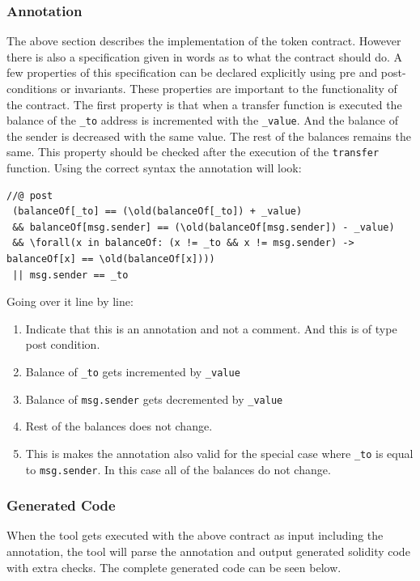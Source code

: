 \documentclass[a4paper]{article}
\begin{document}
\subsubsection{Annotation}
The above section describes the implementation of the token contract. However there is also a specification given in words as to what the contract should do. A few properties of this specification can be declared explicitly using pre and post-conditions or invariants. These properties are important to the functionality of the contract. 
The first property is that when a transfer function is executed the balance of the \texttt{\_to} address is incremented with the \texttt{\_value}. And the balance of the sender is decreased with the same value. The rest of the balances remains the same. This property should be checked after the execution of the \texttt{transfer} function. Using the correct syntax the annotation will look:
\begin{lstlisting}[basicstyle=\ttfamily, breaklines=true ]
//@ post 
 (balanceOf[_to] == (\old(balanceOf[_to]) + _value) 
 && balanceOf[msg.sender] == (\old(balanceOf[msg.sender]) - _value) 
 && \forall(x in balanceOf: (x != _to && x != msg.sender) -> balanceOf[x] == \old(balanceOf[x]))) 
 || msg.sender == _to 
\end{lstlisting}
Going over it line by line:
\begin{enumerate}
  \item Indicate that this is an annotation and not a comment. And this is of type post condition.
  \item Balance of \texttt{\_to} gets incremented by \texttt{\_value}
  \item Balance of \texttt{msg.sender} gets decremented by \texttt{\_value}
  \item Rest of the balances does not change.
  \item This is makes the annotation also valid for the special case where \texttt{\_to} is equal to \texttt{msg.sender}. In this case all of the balances do not change.
\end{enumerate}

\subsubsection{Generated Code}
When the tool gets executed with the above contract as input including the annotation, the tool will parse the annotation and output generated solidity code with extra checks. 
The complete generated code can be seen below.

\end{document}
